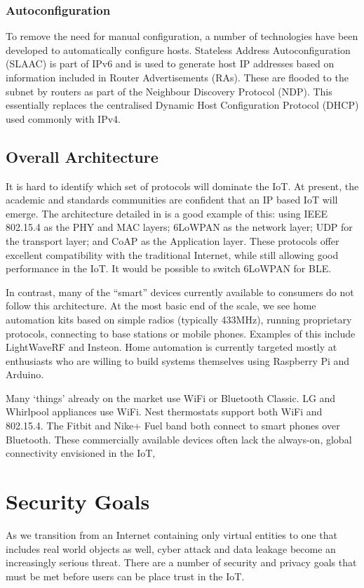 \documentclass[10pt,journal,compsoc]{IEEEtran}
\begin{document}
\subsubsection{Autoconfiguration}
To remove the need for manual configuration, a number of technologies have been
developed to automatically configure hosts. Stateless Address Autoconfiguration
(SLAAC) is part of IPv6 and is used to generate host IP addresses based on
information included in Router Advertisements (RAs). These are flooded to the
subnet by routers as part of the Neighbour Discovery Protocol (NDP). This
essentially replaces the centralised Dynamic Host Configuration Protocol (DHCP)
used commonly with IPv4. 

\subsection{Overall Architecture}
It is hard to identify which set of protocols will dominate the IoT. At
present, the academic and standards communities are confident that an IP based
IoT will emerge. The architecture detailed in \cite{Palattella2013} is a good
example of this: using IEEE 802.15.4 as the PHY and MAC layers; 6LoWPAN as the
network layer; UDP for the transport layer; and CoAP as the Application layer.
These protocols offer excellent compatibility with the traditional Internet,
while still allowing good performance in the IoT. It would be possible to
switch 6LoWPAN for BLE. 

In contrast, many of the ``smart'' devices currently available to consumers do
not follow this architecture. At the most basic end of the scale, we see home
automation kits based on simple radios (typically 433MHz), running proprietary
protocols, connecting to base stations or mobile phones. Examples of this
include LightWaveRF and Insteon. Home automation is currently targeted mostly
at enthusiasts who are willing to build systems themselves using Raspberry Pi
and Arduino.

Many `things' already on the market use WiFi or Bluetooth Classic. LG and
Whirlpool appliances use WiFi.  Nest thermostats support both WiFi and
802.15.4. The Fitbit and Nike+ Fuel band both connect to smart phones over
Bluetooth. These commercially available devices often lack the always-on,
global connectivity envisioned in the IoT,


\section{Security Goals}
As we transition from an Internet containing only virtual entities to one that
includes real world objects as well, cyber attack and data leakage become an
increasingly serious threat. There are a number of security and privacy goals
that must be met before users can be place trust in the IoT.
\end{document}
